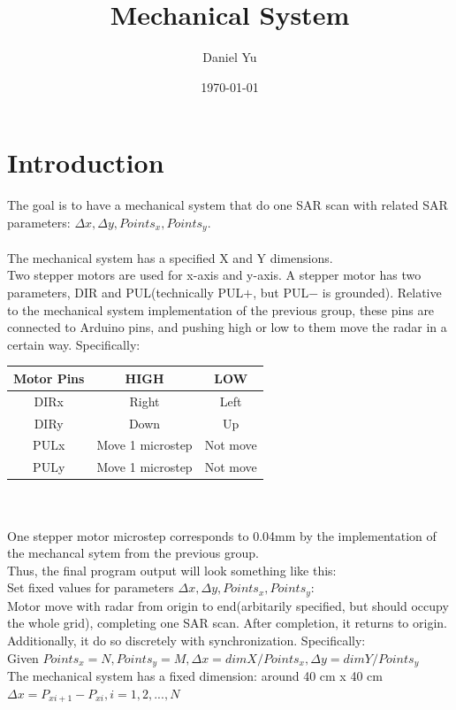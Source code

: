 \documentclass[11pt]{article}
\title{Mechanical System}
\author{Daniel Yu}
\date{\today}
\begin{document}

\maketitle

\section{Introduction}
The goal is to have a mechanical system that do one SAR scan with related SAR parameters: $\Delta x, \Delta y, Points_{x}, Points_{y}$. 
\\\\
The mechanical system has a specified X and Y dimensions.\\
Two stepper motors are used for x-axis and y-axis. A stepper motor has two parameters, DIR and PUL(technically PUL$+$, but PUL$-$ is grounded). Relative to the mechanical system implementation of the previous group, these pins are connected to Arduino pins, and pushing high or low to them move the radar in a certain way. Specifically:\\
\begin{tabular}{|c|c|c|}
\hline
Motor Pins & HIGH & LOW \\ 
\hline
DIRx & Right & Left  \\ 
\hline
DIRy & Down & Up \\ 
\hline
PULx & Move 1 microstep & Not move \\ 
\hline
PULy & Move 1 microstep & Not move \\ 
\hline
\end{tabular}
\\\\
One stepper motor microstep corresponds to 0.04mm by the implementation of the mechancal sytem from the previous group.\\
Thus, the final program output will look something like this: \\
Set fixed values for parameters $\Delta x, \Delta y, Points_{x}, Points_{y}$:\\
Motor move with radar from origin to end(arbitarily specified, but should occupy the whole grid), completing one SAR scan. After completion, it returns to origin.\\
Additionally, it do so discretely with synchronization. Specifically:\\
Given $Points_{x}=N, Points_{y}=M, \Delta x=dim{X}/Points_{x}, \Delta y=dim{Y}/Points_{y}$\\
The mechanical system has a fixed dimension: around 40 cm x 40 cm\\
$\Delta x=P_{xi+1} - P_{xi}, i=1,2,...,N$\\\\
\end{document}
